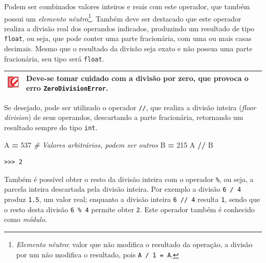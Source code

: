 \documentclass[
]{book}
\newenvironment{Shaded}{\begin{snugshade}}{\end{snugshade}}
\newcommand{\CommentTok}[1]{\textcolor[rgb]{0.56,0.35,0.01}{\textit{#1}}}
\newcommand{\DecValTok}[1]{\textcolor[rgb]{0.00,0.00,0.81}{#1}}
\newcommand{\NormalTok}[1]{#1}
\newcommand{\OperatorTok}[1]{\textcolor[rgb]{0.81,0.36,0.00}{\textbf{#1}}}
\begin{document}
Podem ser combinados valores inteiros e reais com este operador, que também possui um \emph{elemento nêutro}\footnote{\emph{Elemento nêutro}: valor que não modifica o resultado da operação, a divisão por um não modifica o resultado, pois \texttt{A\ /\ 1\ =\ A}.}. Também deve ser destacado que este operador realiza a divisão real dos operandos indicados, produzindo um resultado de tipo \texttt{float}, ou seja, que pode conter uma parte fracionária, com uma ou mais casas decimais. Mesmo que o resultado da divisão seja exato e não possua uma parte fracionária, seu tipo será \texttt{float}.

\begin{longtable}[]{@{}
  >{\centering\arraybackslash}p{}
  >{\raggedright\arraybackslash}p{}@{}}
\toprule
\includegraphics{images/dont.png} & Deve-se tomar cuidado com a divisão por zero, que provoca o erro \texttt{ZeroDivisionError}. \\
\midrule
\endhead
\bottomrule
\end{longtable}

Se desejado, pode ser utilizado o operador \texttt{//}, que realiza a divisão inteira (\emph{floor division}) de seus operandos, descartando a parte fracionária, retornando um resultado sempre do tipo \texttt{int}.

\begin{Shaded}
\begin{Highlighting}[]
\NormalTok{A }\OperatorTok{=} \DecValTok{537} \CommentTok{\# Valores arbitrários, podem ser outros}
\NormalTok{B }\OperatorTok{=} \DecValTok{215}
\NormalTok{A }\OperatorTok{//}\NormalTok{ B}
\end{Highlighting}
\end{Shaded}

\begin{verbatim}
>>> 2
\end{verbatim}

Também é possível obter o resto da divisão inteira com o operador \texttt{\%}, ou seja, a parcela inteira descartada pela divisão inteira. Por exemplo a divisão \texttt{6\ /\ 4} produz \texttt{1.5}, um valor real; enquanto a divisão inteira \texttt{6\ //\ 4} resulta \texttt{1}, sendo que o resto desta divisão \texttt{6\ \%\ 4} permite obter \texttt{2}. Este operador também é conhecido como \emph{módulo}.
\end{document}
